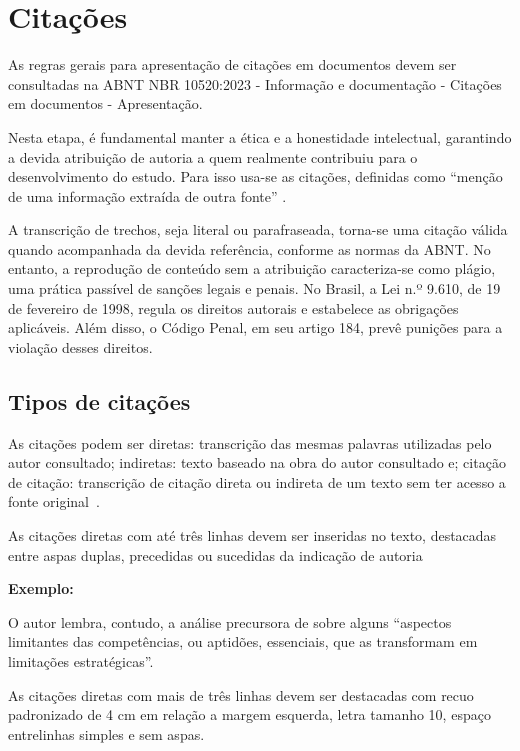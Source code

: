 \section{Citações}

As regras gerais para apresentação de citações em documentos devem ser consultadas na ABNT NBR 10520:2023 - Informação e documentação - Citações em documentos - Apresentação.

Nesta etapa, é fundamental manter a ética e a honestidade intelectual, garantindo a devida atribuição de autoria a quem realmente contribuiu para o desenvolvimento do estudo. Para isso usa-se as citações, definidas como “menção de uma informação extraída de outra fonte” \cite[p. 1]{NBR10520:2023}.

A transcrição de trechos, seja literal ou parafraseada, torna-se uma citação válida quando acompanhada da devida referência, conforme as normas da ABNT. No entanto, a reprodução de conteúdo sem a atribuição caracteriza-se como plágio, uma prática passível de sanções legais e penais. No Brasil, a Lei n.º 9.610, de 19 de fevereiro de 1998, regula os direitos autorais e estabelece as obrigações aplicáveis. Além disso, o Código Penal, em seu artigo 184, prevê punições para a violação desses direitos.

\subsection{Tipos de citações}

As citações podem ser diretas: transcrição das mesmas palavras utilizadas pelo autor consultado; indiretas: texto baseado na obra do autor consultado e; citação de citação: transcrição de citação direta ou indireta de um texto sem ter acesso a fonte original~\cite[p. 1-2]{NBR10520:2023}.

As citações diretas com até três linhas devem ser inseridas no texto, destacadas entre aspas duplas, precedidas ou sucedidas da indicação de autoria


\newpage
\vspace{0.5cm}\noindent\textbf{Exemplo:}

O autor lembra, contudo, a análise precursora de  sobre alguns “aspectos limitantes das competências, ou aptidões, essenciais, que as transformam em limitações estratégicas”.

As citações diretas com mais de três linhas devem ser destacadas com recuo padronizado de 4 cm em relação a margem esquerda, letra tamanho 10, espaço entrelinhas simples e sem aspas.

